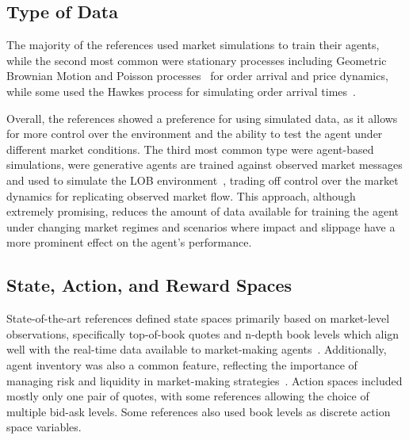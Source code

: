 \subsection{Type of Data}
\label{subsec:type-of-data}

The majority of the references used market simulations to train their agents,
while the second most common were stationary processes including Geometric Brownian Motion and Poisson processes~\cite{Gasperov2021, Sun2022} for
order arrival and price dynamics, while some used the Hawkes process for simulating order arrival times~\cite{Jerome2022, Selser2021}.

Overall, the references showed a preference for using simulated data,
as it allows for more control over the environment and the ability to test the agent under different market conditions.
The third most common type were agent-based simulations, were generative agents are trained
against observed market messages and used to simulate the LOB environment~\cite{Frey2023, Ganesh2019},
trading off control over the market dynamics for replicating observed market flow.
This approach, although extremely promising, reduces the amount of data available for training the agent
under changing market regimes and scenarios where impact and slippage have a more prominent effect on the agent's performance.

\begin{figure}[H]
    \centering
\end{figure}

\subsection{State, Action, and Reward Spaces}
\label{subsec:state-action-and-reward-spaces}
State-of-the-art references defined state spaces primarily based on market-level observations,
specifically top-of-book quotes and n-depth book levels which align well with the real-time data available to market-making agents~\cite{He2023, Bakshaev2020}.
Additionally, agent inventory was also a common feature, reflecting the importance of managing risk and liquidity in market-making strategies~\cite{Patel2018, Ganesh2019}.
Action spaces included mostly only one pair of quotes, with some references allowing the choice of multiple bid-ask levels.
Some references also used book levels as discrete action space variables.


